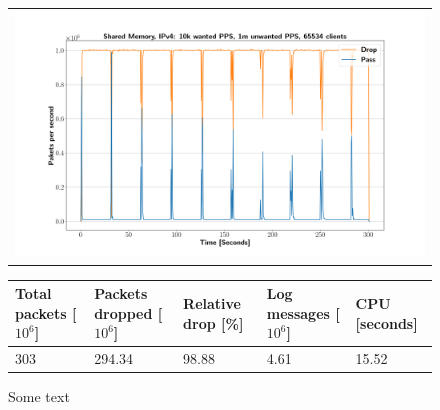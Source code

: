 \begin{figure}[!h]
	\label{fig:simplefail2ban:shm:ip4:1m}
	\centering
	\scriptsize
	\begin{tabular}{c}
    	\centerline{\includegraphics[width=1.2\textwidth]{images/simplefail2ban_shm_ipv4_v10k_iv1m_c65534.png}}
	\end{tabular}
	\begin{tabular}{lllll}
		\toprule
		\textbf{Total packets [$10^6$]} & \textbf{Packets dropped [$10^6$]} & \textbf{Relative drop [\%]} & \textbf{Log messages [$10^6$]} & \textbf{CPU [seconds]} \\ \midrule 
		303 & 294.34 & 98.88 & 4.61 & 15.52 \\
		\bottomrule
	\end{tabular}
	\caption[Simplefail2ban, Shared Memory, IPv4, 1m \ac{PPS}]{Some text}
\end{figure}

